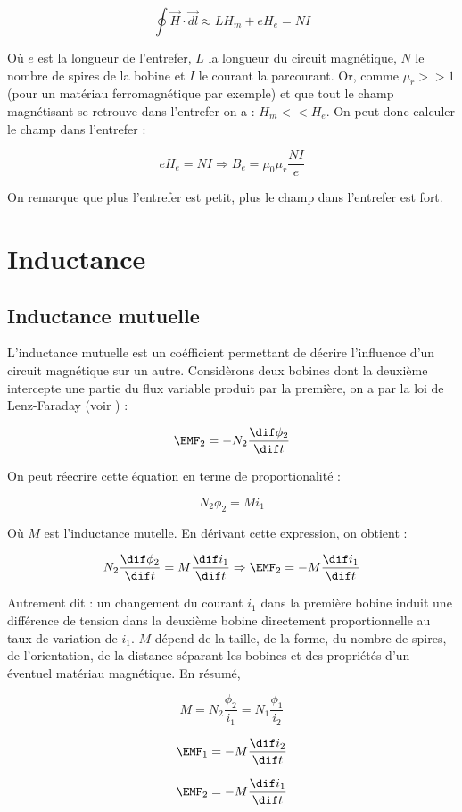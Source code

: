 \[ \oint \vec{H} \cdot \vec{dl} \approx LH_m + eH_e = NI\]

Où $e$ est la longueur de l'entrefer, $L$ la longueur du circuit magnétique, $N$
le nombre de spires de la bobine et $I$ le courant la parcourant.
Or, comme $\mu_r >> 1$ (pour un matériau ferromagnétique par exemple) et que
tout le champ magnétisant se retrouve dans l'entrefer on a : $H_m << H_e$.
On peut donc calculer le champ dans l'entrefer :

\[ eH_e = NI \Rightarrow B_e = \mu_0\mu_r \frac{NI}{e} \]

On remarque que plus l'entrefer est petit, plus le champ dans l'entrefer est
fort.

\section{Inductance}
\subsection{Inductance mutuelle}
L'inductance mutuelle est un coéfficient permettant de décrire l'influence d'un circuit
magnétique sur un autre. Considèrons deux bobines dont la deuxième intercepte une partie
du flux variable produit par la première, on a par la loi de Lenz-Faraday (voir ) :

\[ \EMF_2 = -N_2 \frac{\dif \phi_2}{\dif t} \]

On peut réecrire cette équation en terme de proportionalité :

\[ N_2 \phi_2 = M i_1 \]

Où $M$ est l'inductance mutelle. En dérivant cette expression, on obtient :

\[ N_2 \frac{\dif \phi_2}{\dif t} = M \frac{\dif i_1}{\dif t} \Rightarrow \EMF_2 = -M \frac{\dif i_1}{\dif t} \]

Autrement dit : un changement du courant $i_1$ dans la première
bobine induit une différence de tension dans la deuxième bobine directement proportionnelle
au taux de variation de $i_1$. $M$ dépend de la taille, de la forme, du nombre de spires, de l'orientation,
de la distance séparant les bobines et des propriétés d'un éventuel matériau magnétique.
En résumé,

\[ M = N_2 \frac{\phi_2}{i_1} = N_1 \frac{\phi_1}{i_2} \]

\[ \EMF_1 = -M \frac{\dif i_2}{\dif t} \]

\[ \EMF_2 = -M \frac{\dif i_1}{\dif t} \]

